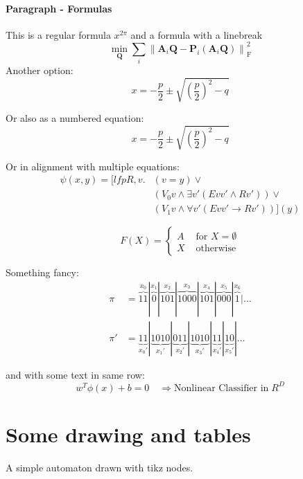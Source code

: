 \documentclass{DESSThesis}
\begin{document}
\paragraph{Paragraph - Formulas}
This is a regular formula $ x^{2 \pi}$ and a formula with a linebreak 
\[ \min_{\mathbf{Q}} \sum_i \left\| \mathbf{A}_i \mathbf{Q} - \mathbf{P}_i(\mathbf{A}_i \mathbf{Q}) \right\|^2_\mathrm{F} \]
Another option:
$$
x = -\frac{p}{2} \pm \sqrt{(\frac{p}{2})^2 -q}
$$

Or also as a numbered equation:
\begin{equation}
	x = -\frac{p}{2} \pm \sqrt{(\frac{p}{2})^2 -q}
\end{equation}

Or in alignment with multiple equations:
\begin{align*}
	\psi(x,y) = [lfp R, v. &(v = y) \vee \\
        &(V_0 v \wedge \exists v' (Evv' \wedge Rv')) \vee\\
        &(V_1 v \wedge \forall v' (Evv' \rightarrow Rv'))](y)
\end{align*}

\[F(X) = \begin{cases}
	A & \mbox{ for } X = \emptyset\\
	X & \mbox{ otherwise}
\end{cases}\]

Something fancy:
\begin{align*}
	\pi  &= \overbrace{11}^{x_0}|\overbrace{0}^{x_1}|\overbrace{101}^{x_2}|\overbrace{100 0}^{x_3}|\overbrace{101}^{x_4}|\overbrace{00 0}^{x_5}|\overbrace{1}^{x_6}|\ldots\\
	\pi' &= \underbrace{11}_{x_0'}|\underbrace{1 010}_{x_1'}|\underbrace{011}_{x_2'}|\underbrace{1 010}_{x_3'}|\underbrace{11}_{x_4'}|\underbrace{1 0}_{x_5'}|\ldots
\end{align*}

and with some text in same row:
\begin{equation*}
    w^T \phi(x) + b =0 \quad \Rightarrow \text{Nonlinear Classifier in} \; R^D
\end{equation*}



\section{Some drawing and tables}
A simple automaton drawn with tikz nodes.\\ 
\end{document}
